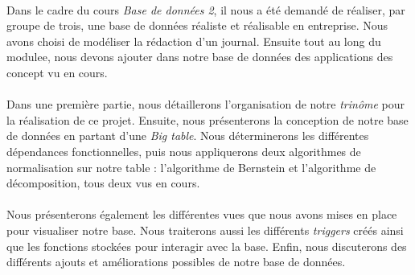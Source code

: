 \paragraph{}{
    Dans le cadre du cours \textit{Base de données 2}, il nous a été demandé de réaliser, par groupe de trois, une base de données réaliste et réalisable en entreprise. Nous avons choisi de modéliser la rédaction d'un journal. Ensuite tout au long du modulee, nous devons ajouter dans notre base de données des applications des concept vu en cours.
}

\paragraph{}{
    Dans une première partie, nous détaillerons l'organisation de notre \textit{trinôme} pour la réalisation de ce projet. Ensuite, nous présenterons la conception de notre base de données en partant d'une \textit{Big table}. Nous déterminerons les différentes dépendances fonctionnelles, puis nous appliquerons deux algorithmes de normalisation sur notre table : l'algorithme de Bernstein et l'algorithme de décomposition, tous deux vus en cours.
}

\paragraph{}{
    Nous présenterons également les différentes vues que nous avons mises en place pour visualiser notre base. Nous traiterons aussi les différents \textit{triggers} créés ainsi que les fonctions stockées pour interagir avec la base. \newline
    Enfin, nous discuterons des différents ajouts et améliorations possibles de notre base de données.
}